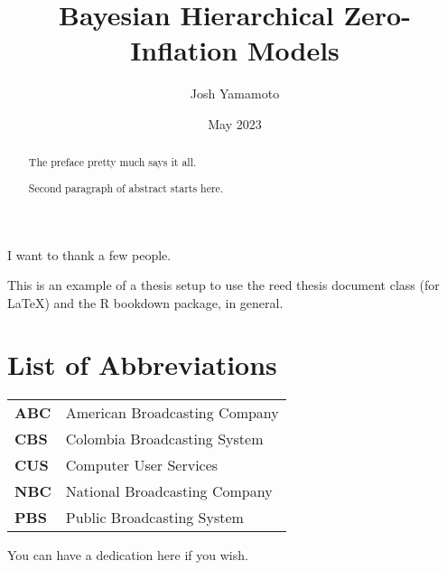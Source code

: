 \documentclass[12pt,twoside]{reedthesis}
\title{Bayesian Hierarchical Zero-Inflation Models}
\author{Josh Yamamoto}
\date{May 2023}
\begin{document}
  \maketitle

\frontmatter %
\pagestyle{empty} %
  \begin{acknowledgements}
    I want to thank a few people.
  \end{acknowledgements}
  \begin{preface}
    This is an example of a thesis setup to use the reed thesis document class
    (for LaTeX) and the R bookdown package, in general.
  \end{preface}
\chapter*{List of Abbreviations}
\begin{table}[h]
    \centering
    \begin{tabular}{ll}
                \textbf{ABC} & American Broadcasting Company \\
                \textbf{CBS} & Colombia Broadcasting System \\
                \textbf{CUS} & Computer User Services \\
                \textbf{NBC} & National Broadcasting Company \\
                \textbf{PBS} & Public Broadcasting System \\
            \end{tabular}
\end{table}
  \hypersetup{linkcolor=black}
  \setcounter{secnumdepth}{2}
  \setcounter{tocdepth}{2}
  \tableofcontents

  \listoftables

  \listoffigures
  \begin{abstract}
    The preface pretty much says it all.

    \par

    Second paragraph of abstract starts here.
  \end{abstract}
  \begin{dedication}
    You can have a dedication here if you wish.
  \end{dedication}
\mainmatter %
\pagestyle{fancyplain} %
\end{document}

